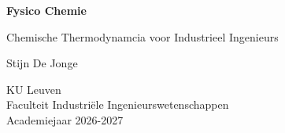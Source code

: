 \documentclass[11pt,a4paper]{book}
\begin{document}
\frontmatter

\begin{titlepage}
\centering
\vspace*{3cm}
{\Huge\bfseries Fysico Chemie\par}
\vspace{1cm}
{\Large Chemische Thermodynamcia voor Industrieel Ingenieurs\par}
\vfill
{\Large Stijn De Jonge\par}
\vspace{0.5cm}
KU Leuven\\
Faculteit Industriële Ingenieurswetenschappen\\
\vspace{0.5cm}
{Academiejaar 2026-2027}
\end{titlepage}

\tableofcontents
\mainmatter











\appendix

\end{document}
